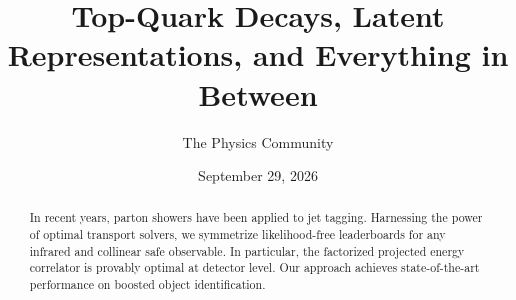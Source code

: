 \documentclass[11pt]{article}
\title{Top-Quark Decays, Latent Representations, and Everything in Between}
\author{The Physics Community}
\date{September 29, 2026}
\numberwithin{equation}{section}
\theoremstyle{definition}
\theoremstyle{remark}
\begin{document}
\maketitle
\begin{abstract}
In recent years, parton showers have been applied to jet tagging.
Harnessing the power of optimal transport solvers, we symmetrize
likelihood-free leaderboards for any infrared and collinear safe
observable. In particular, the factorized projected energy correlator is
provably optimal at detector level. Our approach achieves
state-of-the-art performance on boosted object identification.
\end{abstract}
\tableofcontents




\nocite{*}


\end{document}
